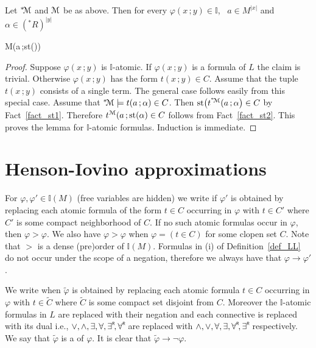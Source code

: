 \documentclass[11pt,oneside]{amsart}
\renewcommand*{\emph}[1]{%
   \smash{\tikz[baseline]\node[rectangle, fill=teal!25, rounded corners, inner xsep=0.5ex, inner ysep=0.2ex, anchor=base, minimum height = 2.7ex]{#1};}}
\begin{document}

\begin{lemma}\label{lem_st}
  Let ${}^*{\!\EuScript M}$ and ${\EuScript M}$ be as above.
  Then for every $\varphi(x\,;y)\in\mathds{I}$, \  $a\in M^{|x|}$ and $\alpha\in({}^*\!R)^{|y|}$ 
  
  {\Rightarrow}
  {{\EuScript M}\models\varphi\big(a\,;{\rm st}(\alpha)\big)}
\end{lemma}

\begin{proof}
  Suppose $\varphi(x\,;y)$ is $\mathds{I}$-atomic.
  If $\varphi(x\,;y)$ is a formula of $L$ the claim is trivial. 
  Otherwise $\varphi(x\,;y)$ has the form $t(x\,;y)\in C$.
  Assume that the tuple $t(x\,;y)$ consists of a single term.
  The general case follows easily from this special case. 
  Assume that ${}^*{\!\EuScript M}\models t(a\,;\alpha)\in C$.
  Then ${\rm st}\big(t^{{}^*{\!\EuScript M}}(a\,;\alpha\big)\in C$ by Fact~\ref{fact_st1}.
  Therefore $t^{{\EuScript M}}(a\,;{\rm st}(\alpha)\in C$ follows from Fact~\ref{fact_st2}.
  This proves the lemma for $\mathds{I}$-atomic formulas.
  Induction is immediate. 
\end{proof}



\section{Henson-Iovino approximations}\label{ultrapws}


For $\varphi,\varphi'\in\mathds{I}(M)$ (free variables are hidden) we write \emph{$\varphi'>\varphi$\/} if $\varphi'$ is obtained by replacing each atomic formula of the form $t\in C$ occurring in $\varphi$ with $t\in C'$ where $C'$ is some compact neighborhood of $C$.
If no such atomic formulas occur in $\varphi$, then $\varphi>\varphi$.
We also have $\varphi>\varphi$ when $\varphi=(t\in C)$ for some clopen set $C$.
Note that $>$ is a dense (pre)order of $\mathds{I}(M)$.
Formulas in (i) of Definition~\ref{def_LL} do not occur under the scope of a negation, therefore we always have that $\varphi\to\varphi'$.

We write \emph{$\tilde{\varphi}\perp\varphi$\/} when $\tilde{\varphi}$ is obtained by replacing each atomic formula $t\in C$ occurring in $\varphi$ with $t\in\tilde{C}$ where $\tilde{C}$ is some compact set disjoint from $C$.
Moreover the $\mathds{I}$-atomic formulas in $L$ are replaced with their negation and each connective is replaced with its dual i.e., $\vee, \wedge, \exists, \forall, \existsR , \forallR $ are replaced with $\wedge,\vee,\forall,\exists,\forallR ,\existsR $ respectively.
We say that  $\tilde{\varphi}$ is a \emph{strong negation} of $\varphi$.
It is clear that $\tilde{\varphi}\rightarrow\neg\varphi$.
\end{document}
